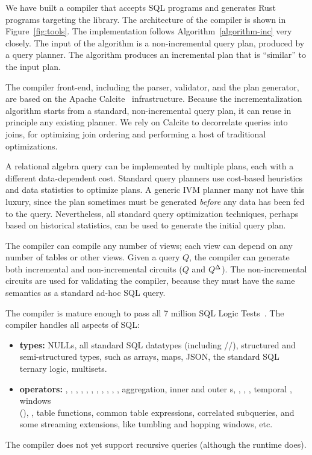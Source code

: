 We have built a compiler that accepts SQL programs and generates Rust
programs targeting the \dbsp library.  The architecture of the
compiler is shown in Figure~\ref{fig:tools}.  The implementation
follows Algorithm~\ref{algorithm-inc} very closely.  The input of the
algorithm is a non-incremental query plan, produced by a query
planner.  The algorithm produces an incremental plan that is
``similar'' to the input plan.

The compiler front-end, including the parser, validator, and the plan
generator, are based on the Apache Calcite~\cite{begoli-icmd18}
infrastructure.  Because the incrementalization algorithm starts from
a standard, non-incremental query plan, it can reuse in principle any
existing planner.  We rely on Calcite to decorrelate queries into
joins, for optimizing join ordering and performing a host of
traditional optimizations.

A relational algebra query can be implemented by multiple plans, each
with a different data-dependent cost.  Standard query planners use
cost-based heuristics and data statistics to optimize plans.  A
generic IVM planner many not have this luxury, since the plan
sometimes must be generated \emph{before} any data has been fed to the
query.  Nevertheless, all standard query optimization techniques,
perhaps based on historical statistics, can be used to generate the
initial query plan.

The compiler can compile any number of views; each view can depend on
any number of tables or other views.  Given a query $Q$, the compiler
can generate both incremental and non-incremental circuits ($Q$ and
${Q}^{\Delta}$).  The non-incremental circuits are used for validating the
compiler, because they must have the same semantics as a standard
ad-hoc SQL query.

The compiler is mature enough to pass all 7 million SQL Logic
Tests~\cite{sqllogictest}.  The compiler handles all aspects of SQL:
\begin{itemize}
\item \textbf{types:} NULLs, all standard SQL datatypes (including
  //), structured and
  semi-structured types, such as arrays, maps, JSON, the standard SQL
  ternary logic, multisets.
\item \textbf{operators:} , , ,
  ,  , ,
  , , , ,
  , aggregation, inner and outer s,
  , , , temporal ,
  windows \\ (), , table
  functions, common table expressions, correlated subqueries, and some
  streaming extensions, like tumbling and hopping windows, etc.
\end{itemize}
The compiler does not yet support recursive queries (although the
runtime does).

